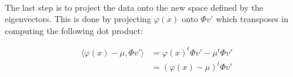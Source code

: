\paragraph{} The last step is to project the data onto the new space defined by
the eigenvectors.  This is done by projecting $\varphi(x)$ onto $\Phi v'$ which
transposes in computing the following dot product:

\begin{align*}
\langle\varphi(x) - \mu, \Phi v'\rangle &= \varphi(x)^t\Phi v' - \mu^t\Phi v' \\
&= (\varphi(x) - \mu)^t\Phi v'
\end{align*}
